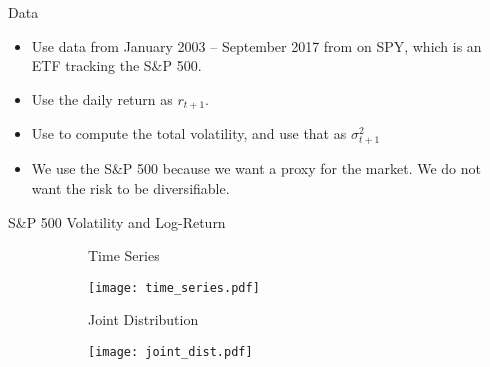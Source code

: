 \documentclass[smaller, aspectratio=169]{beamer}
\begin{document}
\begin{frame}[c]{Data}
    \begin{itemize}
        \item Use data from January 2003 -- September 2017  from on SPY, which is an ETF tracking the S\&P 500.
            \bigskip
%
        \item Use the daily return as $r_{t+1}$.
            \bigskip
%
        \item Use \textcite{sangrey2018jumps} to compute the total volatility, and use that as $\sigma^2_{t+1}$
            \bigskip
%
        \item We use the S\&P 500 because we want a proxy for the market. We do not want the risk to be diversifiable.
    \end{itemize}
\end{frame}

\begin{frame}[c]{S\&P 500 Volatility and Log-Return}

    \begin{figure}[htb]
    
        \begin{subfigure}[t]{.54\textwidth}
            \centering
            Time Series

            \texttt{[image: time\_series.pdf]}
        \end{subfigure}%
        \hfill
        \begin{subfigure}[t]{.44\textwidth}
            \centering
            Joint Distribution

            \texttt{[image: joint\_dist.pdf]}
        \end{subfigure}
    \end{figure}

\end{frame}
\end{document}
